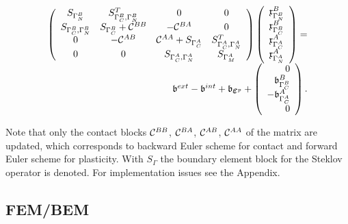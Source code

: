 \documentclass[12pt,a4paper]{scrbook}
\begin{document}
\begin{equation*}
 \begin{array}{r}
   \left (
   \begin{array}{cccc}
   S_{\Gamma^{\sl}_N}    & S^{T}_{\Gamma^{\sl}_C,\Gamma^{\sl}_N}                 & 0                & 0\\
   S_{\Gamma^{\sl}_C,\Gamma^{\sl}_N} & S_{\Gamma^{\sl}_C} + \mathcal{C}^{\sl \sl}   & -\mathcal{C}^{\sl \ms}& 0 \\
   0               & -\mathcal{C}^{\ms \sl} & \mathcal{C}^{\ms \ms}+ S_{\Gamma^{\ms}_C}  & S^T_{\Gamma^{\ms}_C,\Gamma^{\ms}_N} \\
   0               & 0                 & S_{\Gamma^{\ms}_C,\Gamma^{\ms}_N} & S_{\Gamma^{\ms}_M}
   \end{array}
   \right )
 \left (
  \begin{array}{l}
      \mathfrak x^{\sl}_{\Gamma_N^{\sl}} \\
      \mathfrak x^{\sl}_{\Gamma_C^{\sl}} \\
      \mathfrak x^{\ms}_{\Gamma_C^{\ms}} \\
      \mathfrak x^{\ms}_{\Gamma_N^{\ms}} 
  \end{array}
 \right )
= \\
 {\mathfrak b}^{ext} - {\mathfrak b}^{int} + {\mathfrak b}_{\bv{\e}^p} +
 \left (
  \begin{array}{r}
      0 \\
      {\mathfrak b}^{\sl}_{\Gamma_C^{\sl}} \\
      -{\mathfrak b}^{\ms}_{\Gamma_C^{\ms}} \\
      0 
  \end{array}
 \right ).
 \end{array}
\end{equation*}

Note that only the contact blocks $\mathcal{C}^{\sl \sl}$, $\mathcal{C}^{\sl \ms}$, $\mathcal{C}^{\ms \sl}$, $\mathcal{C}^{\ms \ms}$ of the matrix are updated, which corresponds to backward Euler scheme for contact  and forward Euler scheme for plasticity.  With $S_{\Gamma}$ the boundary element  block for the Steklov operator is denoted. For  implementation issues see the Appendix.

\subsection{FEM/BEM}\label{sec:FEMBEM}
\end{document}
